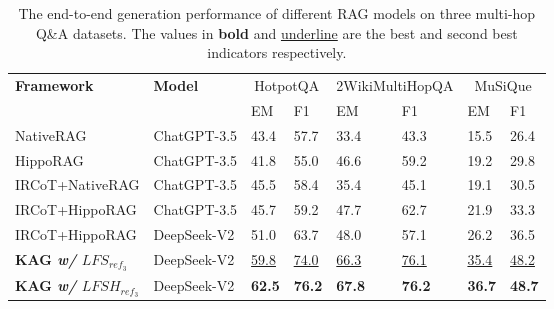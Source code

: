 \documentclass{article}
\begin{document}
\renewcommand\arraystretch{1.1}
\begin{table}[htbp]
\centering
\small
\setlength\aboverulesep{0pt}\setlength\belowrulesep{0pt}
\begin{tabular}{l|p{1.9cm}<{\centering}|p{1.0cm}<{\centering} p{1.0cm}<{\centering}|p{1.0cm}<{\centering} p{1.0cm}<{\centering}|p{1.0cm}<{\centering} p{1.0cm}<{\centering}}
    \toprule
    \multirow{2}{*}{\textbf{Framework}}                      & \multirow{2}{*}{\textbf{Model}} & \multicolumn{2}{c|}{HotpotQA}  & \multicolumn{2}{c|}{2WikiMultiHopQA} & \multicolumn{2}{c}{MuSiQue}   \\ \cline{3-8}
     &   & EM & F1 & EM & F1 & EM & F1  \\  
    \midrule
    NativeRAG~\cite{baserag,ColBERTv2}& ChatGPT-3.5 & 43.4 & 57.7 & 33.4 & 43.3 & 15.5 & 26.4 \\
    HippoRAG~\cite{gutierrez2024hipporag,ColBERTv2}& ChatGPT-3.5 & 41.8 & 55.0 & 46.6 & 59.2 & 19.2 & 29.8 \\ \hline
    IRCoT+NativeRAG & ChatGPT-3.5 & 45.5 & 58.4 & 35.4 & 45.1 & 19.1 & 30.5 \\
    IRCoT+HippoRAG & ChatGPT-3.5 & 45.7 & 59.2 & 47.7 & 62.7 & 21.9 & 33.3 \\
    \hline
    IRCoT+HippoRAG & DeepSeek-V2 & 51.0 & 63.7 & 48.0 & 57.1 & 26.2 & 36.5 \\
    \textbf{KAG \textit{w/} $LFS_{ref_{3}}$} & DeepSeek-V2 & \underline{59.8} & \underline{74.0} & \underline{66.3} & \underline{76.1} & \underline{35.4} & \underline{48.2} \\
    \textbf{KAG \textit{w/} $LFSH_{ref_{3}}$} & DeepSeek-V2 & \textbf{62.5} & \textbf{76.2} & \textbf{67.8} & \textbf{76.2} & \textbf{36.7} & \textbf{48.7} \\
    \bottomrule
 \end{tabular}
\caption{The end-to-end generation performance of different RAG models on three multi-hop Q\&A datasets. The values in \textbf{bold} and \underline{underline} are the best and second best indicators respectively.} 
\label{PerformanceOfQA} 
\end{table}
\end{document}

